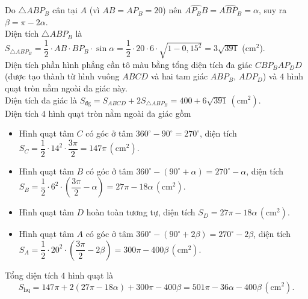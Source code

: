\begin{ex}
{{
		}
		\noindent Do $\triangle A B P_B$ cân tại $A$ (vì $AB=AP_B=20$) nên $\widehat{AP_BB} = \widehat{ABP_B} = \alpha$, suy ra $\beta = \pi - 2\alpha$.\\
		Diện tích $\triangle A B P_B$ là $S_{\triangle A B P_B} = \dfrac{1}{2} \cdot AB \cdot BP_B \cdot \sin \alpha = \dfrac{1}{2} \cdot 20 \cdot 6 \cdot \sqrt{1 - 0{,}15^2} = 3\sqrt{391}$ (cm$^2$).\\
		Diện tích phần hình phẳng cần tô màu bằng tổng diện tích đa giác $C B P_B A P_D D$ (được tạo thành từ hình vuông $ABCD$ và hai tam giác $A B P_B$, $A D P_D$) và $4$ hình quạt tròn nằm ngoài đa giác này.\\
		Diện tích đa giác là $S_{\text{đg}} = S_{ABCD} + 2S_{\triangle A B P_B} = 400 + 6\sqrt{391}\,\left(\text{cm}^2\right)$.\\
		Diện tích $4$ hình quạt tròn nằm ngoài đa giác gồm
		\begin{itemize}
			\item Hình quạt tâm $C$ có góc ở tâm $360^\circ - 90^\circ = 270^\circ$, diện tích $S_C = \dfrac{1}{2} \cdot 14^2 \cdot \dfrac{3\pi}{2} = 147\pi\,\left(\text{cm}^2\right)$.
			\item Hình quạt tâm $B$ có góc ở tâm $360^\circ - (90^\circ + \alpha) = 270^\circ - \alpha$, diện tích $S_B = \dfrac{1}{2} \cdot 6^2 \cdot \left(\dfrac{3\pi}{2} - \alpha\right) = 27\pi - 18\alpha\,\left(\text{cm}^2\right)$.
			\item Hình quạt tâm $D$ hoàn toàn tương tự, diện tích $S_D = 27\pi - 18\alpha\,\left(\text{cm}^2\right)$.
			\item Hình quạt tâm $A$ có góc ở tâm $360^\circ - (90^\circ + 2\beta) = 270^\circ - 2\beta$, diện tích $S_A = \dfrac{1}{2} \cdot 20^2 \cdot \left(\dfrac{3\pi}{2} - 2\beta\right) = 300\pi - 400\beta\,\left(\text{cm}^2\right)$.
		\end{itemize}
		Tổng diện tích $4$ hình quạt là
		\[ S_{\text{hq}} = 147\pi + 2(27\pi - 18\alpha) + 300\pi - 400\beta = 501\pi - 36\alpha - 400\beta\,\left(\text{cm}^2\right). \]
}
\end{ex}
